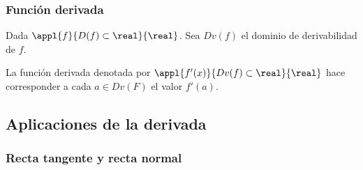 



\subsubsection{Función derivada}

\begin{defn}
Dada $\appl{f}{D(f)\subset\real}{\real}$. Sea $Dv(f)$ el dominio de derivabilidad de $f$.

La función derivada denotada por $\appl{f'(x)}{Dv(f)\subset\real}{\real}$ hace corresponder a cada $a\in Dv(F)$ el valor $f'(a)$.
\end{defn}






\subsection{Aplicaciones de la derivada}

\subsubsection{Recta tangente y recta normal}

